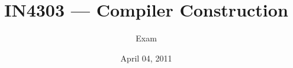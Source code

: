 \documentclass[a4paper, addpoints, answers]{exam}
\title{IN4303 --- Compiler Construction}
\author{Exam}
\date{April 04, 2011}
\newcommand{\ifsolutionnewpage}
{\ifprintanswers \newpage \fi}
\begin{document}


\pointsinrightmargin
\totalformat{(\totalpoints\ \points)}

\begin{questions}







\ifsolutionnewpage



\ifsolutionnewpage





\newpage             






\end{questions}
\end{document}

